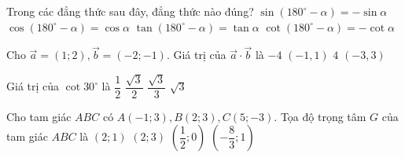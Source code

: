 \begin{ex}%
    Trong các đẳng thức sau đây, đẳng thức nào đúng?
    \choice
    {$\sin (180^\circ-\alpha)=-\sin \alpha $}
    {$\cos (180^\circ-\alpha)=\cos \alpha $}
    {$\tan (180^\circ-\alpha)=\tan \alpha $}
    {\True $\cot (180^\circ-\alpha)=-\cot \alpha $}
\end{ex}

\begin{ex}%
    Cho $\overrightarrow{a}=\left(1;2\right),\overrightarrow{b}=\left(-2;-1\right)$. Giá trị của $\vec{a}\cdot \vec{b}$ là
    \choice
    {\True $-4$}
    {$\left(-1,1\right)$}
    {$4$}
    {$\left(-3,3\right)$}
\end{ex}

\begin{ex}%
    Giá trị của $\cot 30^\circ$ là
    \choice
    {$\dfrac{1}{2}$}
    {$\dfrac{\sqrt{3}}{2}$}
    {$\dfrac{\sqrt{3}}{3}$}
    {\True $\sqrt{3}$}
\end{ex}
\begin{ex}%
    Cho tam giác $ABC$ có $A\left(-1;3\right),B\left(2;3\right),C\left(5;-3\right)$. Tọa độ trọng tâm $G$ của tam giác $ABC$ là
    \choice
    {\True $\left(2;1\right)$}
    {$\left(2;3\right)$}
    {$\left(\dfrac{1}{2};0\right)$}
    {$\left(-\dfrac{8}{3};1\right)$}
\end{ex}

